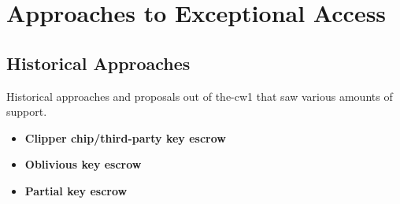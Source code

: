 

\countriesend




\section{Approaches to Exceptional Access}
\label{sec-tech-approaches}



\subsection{Historical Approaches}

Historical approaches and proposals out of \ac{the-cw1} that saw various amounts of support.

\newcommand{\propsstart}[0]{\begin{itemize}}
\newcommand{\prop}[2]{\item \textbf{#1} \cite{#2}} %
\newcommand{\propsend}{\end{itemize}}

\propsstart
    \prop{Clipper chip/third-party key escrow}{press_1993}
    \prop{Oblivious key escrow}{goos_oblivious_1996}
    \prop{Partial key escrow}{denning_taxonomy_1996}
\propsend


